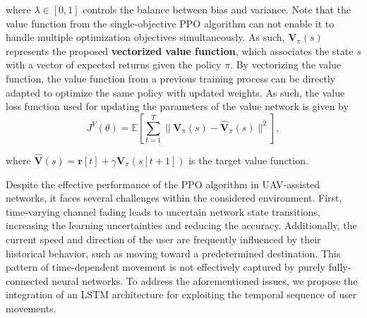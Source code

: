 \documentclass[10pt,journal,compsoc]{IEEEtran}
\begin{document}
\noindent where $\lambda \in [0, 1]$ controls the balance between bias and variance. Note that the value function from the single-objective PPO algorithm can not enable it to handle multiple optimization objectives simultaneously. As such, $\boldsymbol{V}_{\pi}(s)$ represents the proposed \textbf{vectorized value function}, which associates the state $s$ with a vector of expected returns given the policy $\pi$. By vectorizing the value function, the value function from a previous training process can be directly adapted to optimize the same policy with updated weights. As such, the value loss function used for updating the parameters of the value network is given by
\begin{equation}
    \label{eq:loss}
    J^V(\theta) = \mathbb{E} \left[ \sum_{t=1}^T \| \boldsymbol{V}_{\pi}(s) - \hat{\boldsymbol{V}}_{\pi}(s) \|^2 \right],
\end{equation}

\noindent where $\hat{\boldsymbol{V}}(s) = \boldsymbol{r}[t] + \gamma \boldsymbol{V}_{\pi}(s[t+1])$ is the target value function. 

\par Despite the effective performance of the PPO algorithm in UAV-assisted networks, it faces several challenges within the considered environment. First, time-varying channel fading leads to uncertain network state transitions, increasing the learning uncertainties and reducing the accuracy. Additionally, the current speed and direction of the user are frequently influenced by their historical behavior, such as moving toward a predetermined destination. This pattern of time-dependent movement is not effectively captured by purely fully-connected neural networks. To address the aforementioned issues, we propose the integration of an LSTM architecture for exploiting the temporal sequence of user movements.



\end{document}
